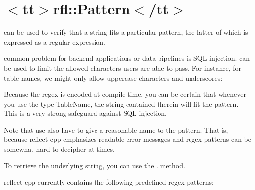\chapter{\texorpdfstring{$<$}{<}tt\texorpdfstring{$>$}{>}rfl\+::Pattern\texorpdfstring{$<$}{<}/tt\texorpdfstring{$>$}{>}}
\hypertarget{md_external_2reflect-cpp_2docs_2patterns}{}\label{md_external_2reflect-cpp_2docs_2patterns}
\label{md_external_2reflect-cpp_2docs_2patterns_autotoc_md617}%
%


{\ttfamily {}} can be used to verify that a string fits a particular pattern, the latter of which is expressed as a regular expression.

 common problem for backend applications or data pipelines is SQL injection. {\ttfamily {}} can be used to limit the allowed characters users are able to pass. For instance, for table names, we might only allow uppercase characters and underscores\+:


\begin{DoxyCode}{0}

\end{DoxyCode}


Because the regex is encoded at compile time, you can be certain that whenever you use the type {\ttfamily Table\+Name}, the string contained therein will fit the pattern. This is a very strong safeguard against SQL injection.

Note that use also have to give a reasonable name to the pattern. That is, because reflect-\/cpp emphasizes readable error messages and regex patterns can be somewhat hard to decipher at times.

To retrieve the underlying string, you can use the {\ttfamily .} method.

reflect-\/cpp currently contains the following predefined regex patterns\+:


